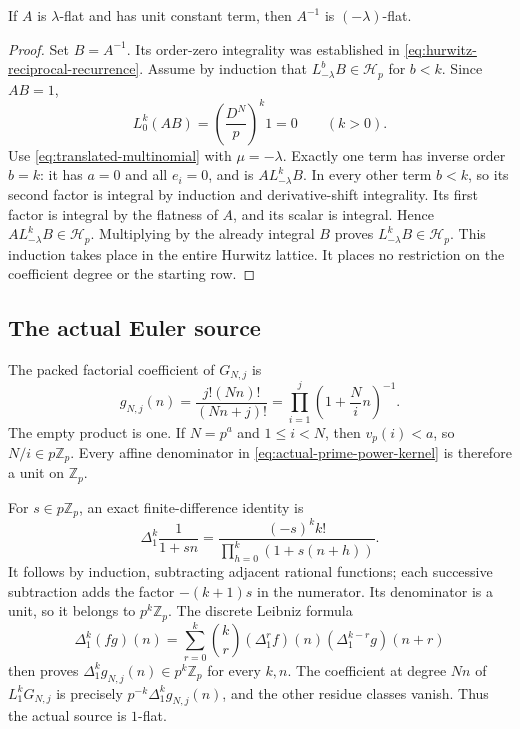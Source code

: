 \begin{lemma}
\label{lem:translated-hurwitz-inverse}
If $A$ is $\lambda$-flat and has unit constant term, then $A^{-1}$ is
$(-\lambda)$-flat.
\end{lemma}

\begin{proof}
Set $B=A^{-1}$. Its order-zero integrality was established in
\eqref{eq:hurwitz-reciprocal-recurrence}. Assume by induction that
$L_{-\lambda}^bB\in\mathcal H_p$ for $b<k$. Since $AB=1$,
\[
 L_0^k(AB)=\left(\frac{D^N}{p}\right)^k1=0\qquad(k>0).
\]
Use \eqref{eq:translated-multinomial} with $\mu=-\lambda$.
Exactly one term has inverse order $b=k$: it has $a=0$ and all $e_i=0$,
and is $A L_{-\lambda}^k B$. In every other term $b<k$, so its second
factor is integral by induction and derivative-shift integrality. Its
first factor is integral by the flatness of $A$, and its scalar is
integral. Hence $A L_{-\lambda}^k B\in\mathcal H_p$. Multiplying by the
already integral $B$ proves $L_{-\lambda}^k B\in\mathcal H_p$.
This induction takes place in the entire Hurwitz lattice. It places no
restriction on the coefficient degree or the starting row.
\end{proof}

\subsection{The actual Euler source}

The packed factorial coefficient of $G_{N,j}$ is
\begin{equation}
 g_{N,j}(n)=\frac{j!(Nn)!}{(Nn+j)!}
   =\prod_{i=1}^j\left(1+\frac Ni n\right)^{-1}.
 \label{eq:actual-prime-power-kernel}
\end{equation}
The empty product is one. If $N=p^a$ and $1\leq i<N$, then
$v_p(i)<a$, so $N/i\in p\mathbb Z_p$. Every affine denominator in
\eqref{eq:actual-prime-power-kernel} is therefore a unit on $\mathbb Z_p$.

For $s\in p\mathbb Z_p$, an exact finite-difference identity is
\begin{equation}
 \Delta_1^k\frac1{1+sn}
  =\frac{(-s)^k k!}{\prod_{h=0}^k(1+s(n+h))}.
 \label{eq:affine-reciprocal-exact}
\end{equation}
It follows by induction, subtracting adjacent rational functions; each
successive subtraction adds the factor $-(k+1)s$ in the numerator.
Its denominator is a unit, so it belongs to $p^k\mathbb Z_p$.
The discrete Leibniz formula
\begin{equation}
 \Delta_1^k(fg)(n)
 =\sum_{r=0}^k\binom kr
       (\Delta_1^r f)(n)(\Delta_1^{k-r}g)(n+r)
 \label{eq:discrete-leibniz-final}
\end{equation}
then proves $\Delta_1^k g_{N,j}(n)\in p^k\mathbb Z_p$ for every $k,n$.
The coefficient at degree $Nn$ of $L_1^kG_{N,j}$ is precisely
$p^{-k}\Delta_1^k g_{N,j}(n)$, and the other residue classes vanish.
Thus the actual source is $1$-flat.

